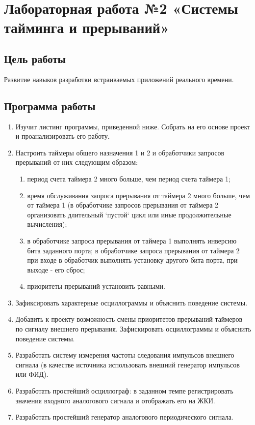 \documentclass[14pt,a4paper,report]{report}
\begin{document}
\clearpage

\chapter {Лабораторная работа №2 «Системы тайминга и прерываний»}

\section {Цель работы}

Развитие навыков разработки встраиваемых приложений реального времени. 

\section{Программа работы}

\begin{enumerate}
	\item Изучит листинг программы, приведенной ниже. Собрать на его основе проект и проанализировать его работу.
	\item Настроить таймеры общего назначения 1 и 2 и обработчики запросов прерываний от них следующим образом:
	\begin{enumerate}
		\item период счета таймера 2 много больше, чем период счета таймера 1;
		\item время обслуживания запроса прерывания от таймера 2 много больше, чем от таймера 1 (в обработчике запросов прерывания от таймера 2 организовать длительный `пустой` цикл или иные продолжительные вычисления);
		\item в обработчике запроса прерывания от таймера 1 выполнять инверсию бита заданного порта; в обработчике запроса прерывания от таймера 2 при входе в обработчик выполнять установку другого бита порта, при выходе - его сброс;
		\item приоритеты прерываний установить равными.
	\end{enumerate}
	\item Зафиксировать характерные осциллограммы и объяснить поведение системы.
	\item Добавить к проекту возможность смены приоритетов прерываний таймеров по сигналу внешнего прерывания. Зафискировать осциллограммы и объяснить поведение системы.
	\item Разработать систему измерения частоты следования импульсов внешнего сигнала (в качестве источника использовать внешний генератор импульсов или ФИД).
	\item Разработать простейший осциллограф: в заданном темпе регистрировать значения входного аналогового сигнала и отображать его на ЖКИ.
	\item Разработать простейший генератор аналогового периодического сигнала.
\end{enumerate}
\end{document}

